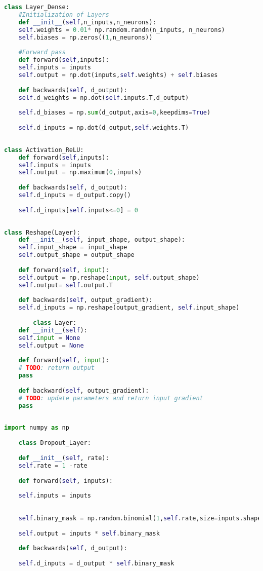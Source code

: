 \begin{lstlisting}[language=Python, caption=Dense Layer]
	class Layer_Dense:
	#Initialization of Layers
	def __init__(self,n_inputs,n_neurons):
	self.weights = 0.01* np.random.randn(n_inputs, n_neurons) 
	self.biases = np.zeros((1,n_neurons))
	
	#Forward pass
	def forward(self,inputs):
	self.inputs = inputs
	self.output = np.dot(inputs,self.weights) + self.biases
	
	def backwards(self, d_output):
	self.d_weights = np.dot(self.inputs.T,d_output)
	
	self.d_biases = np.sum(d_output,axis=0,keepdims=True)   
	
	self.d_inputs = np.dot(d_output,self.weights.T)
	
\end{lstlisting}


\begin{lstlisting}[language=Python, caption=ReLU Layer]
	class Activation_ReLU:
	def forward(self,inputs):
	self.inputs = inputs
	self.output = np.maximum(0,inputs)
	
	def backwards(self, d_output):
	self.d_inputs = d_output.copy()
	
	self.d_inputs[self.inputs<=0] = 0
	
\end{lstlisting}


\begin{lstlisting}[language=Python, caption=Reshape Layer]
	class Reshape(Layer):
	def __init__(self, input_shape, output_shape):
	self.input_shape = input_shape
	self.output_shape = output_shape
	
	def forward(self, input):
	self.output = np.reshape(input, self.output_shape)
	self.output= self.output.T
	
	def backwards(self, output_gradient):
	self.d_inputs = np.reshape(output_gradient, self.input_shape)
	
		class Layer:
	def __init__(self):
	self.input = None
	self.output = None
	
	def forward(self, input):
	# TODO: return output
	pass
	
	def backward(self, output_gradient):
	# TODO: update parameters and return input gradient
	pass
	
\end{lstlisting}

\begin{lstlisting}[language=Python, caption=Dropout Layer]
	import numpy as np
	
	class Dropout_Layer:
	
	def __init__(self, rate):
	self.rate = 1 -rate
	
	def forward(self, inputs):
	
	self.inputs = inputs
	
	
	self.binary_mask = np.random.binomial(1,self.rate,size=inputs.shape) / self.rate
	
	self.output = inputs * self.binary_mask
	
	def backwards(self, d_output):
	
	self.d_inputs = d_output * self.binary_mask
	
\end{lstlisting}

